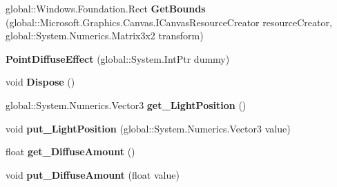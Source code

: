 \begin{DoxyCompactItemize}
global\+::\+Windows.\+Foundation.\+Rect {\bfseries Get\+Bounds} (global\+::\+Microsoft.\+Graphics.\+Canvas.\+I\+Canvas\+Resource\+Creator resource\+Creator, global\+::\+System.\+Numerics.\+Matrix3x2 transform)
\item 
\mbox{\label{class_microsoft_1_1_graphics_1_1_canvas_1_1_effects_1_1_point_diffuse_effect_a339b570af9f36502e7a354c01bdefc1a}} 
{\bfseries Point\+Diffuse\+Effect} (global\+::\+System.\+Int\+Ptr dummy)
\item 
\mbox{\label{class_microsoft_1_1_graphics_1_1_canvas_1_1_effects_1_1_point_diffuse_effect_aab9fe4ed8a06cb7b338c2b768c889cc4}} 
void {\bfseries Dispose} ()
\item 
\mbox{\label{class_microsoft_1_1_graphics_1_1_canvas_1_1_effects_1_1_point_diffuse_effect_adc8bd7af80c3dba7ae3387489695b283}} 
global\+::\+System.\+Numerics.\+Vector3 {\bfseries get\+\_\+\+Light\+Position} ()
\item 
\mbox{\label{class_microsoft_1_1_graphics_1_1_canvas_1_1_effects_1_1_point_diffuse_effect_ac426fad2476e24dd0029d5df1a2d6f1c}} 
void {\bfseries put\+\_\+\+Light\+Position} (global\+::\+System.\+Numerics.\+Vector3 value)
\item 
\mbox{\label{class_microsoft_1_1_graphics_1_1_canvas_1_1_effects_1_1_point_diffuse_effect_aebeb09f011a975a725b9ccef39d2f898}} 
float {\bfseries get\+\_\+\+Diffuse\+Amount} ()
\item 
\mbox{\label{class_microsoft_1_1_graphics_1_1_canvas_1_1_effects_1_1_point_diffuse_effect_affb2f6cbd197bd128a5db97cc5456962}} 
void {\bfseries put\+\_\+\+Diffuse\+Amount} (float value)
\item 
\mbox{\label{class_microsoft_1_1_graphics_1_1_canvas_1_1_effects_1_1_point_diffuse_effect_a8c5829829e52c84efac9568f69940ea3}} 

\end{DoxyCompactItemize}

